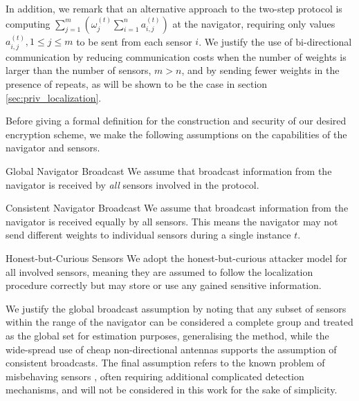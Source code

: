 \documentclass[10pt,letterpaper,oneside,twocolumn,journal]{IEEEtran}
\theoremstyle{definition}
\theoremstyle{definition}
\theoremstyle{remark}
\begin{document}
In addition, we remark that an alternative approach to the two-step protocol is computing $\sum^{m}_{j=1}(\omega_j^{(t)}\sum^{n}_{i=1} a_{i,j}^{(t)})$ at the navigator, requiring only values $a_{i,j}^{(t)}, 1 \leq j \leq m$ to be sent from each sensor $i$. We justify the use of bi-directional communication by reducing communication costs when the number of weights is larger than the number of sensors, $m>n$, and by sending fewer weights in the presence of repeats, as will be shown to be the case in section \ref{sec:priv_localization}.

Before giving a formal definition for the construction and security of our desired encryption scheme, we make the following assumptions on the capabilities of the navigator and sensors.
\begin{LaTeXdescription}
    \item[Global Navigator Broadcast] We assume that broadcast information from the navigator is received by \textit{all} sensors involved in the protocol.
    \item[Consistent Navigator Broadcast] We assume that broadcast information from the navigator is received equally by all sensors. This means the navigator may not send different weights to individual sensors during a single instance $t$.
    \item[Honest-but-Curious Sensors] We adopt the honest-but-curious attacker model for all involved sensors, meaning they are assumed to follow the localization procedure correctly but may store or use any gained sensitive information.
\end{LaTeXdescription}
We justify the global broadcast assumption by noting that any subset of sensors within the range of the navigator can be considered a complete group and treated as the global set for estimation purposes, generalising the method, while the wide-spread use of cheap non-directional antennas supports the assumption of consistent broadcasts. The final assumption refers to the known problem of misbehaving sensors \cite{lazosSeRLocSecureRangeindependent2004,ben-galOutlierDetection2005}, often requiring additional complicated detection mechanisms, and will not be considered in this work for the sake of simplicity.
\end{document}
